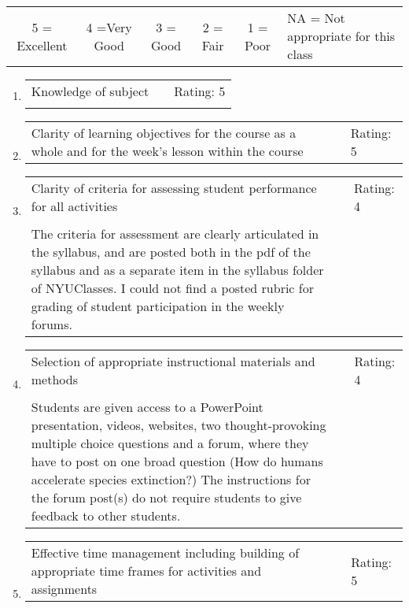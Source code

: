 \documentclass[11pt,dvipsnames]{article}
\begin{document}

{\tabulinesep=1.2mm
	\begin{tabu}{c  c c c c p{4cm} }
		
		5 = Excellent   & 4 =Very Good & 3 = Good & 2 = Fair & 1 = Poor & NA = Not appropriate for this class  \\ 	
	\end{tabu}}
\vskip 0.5cm

\begin{enumerate}[label= {\bf  \arabic*:}]
	\item
	\begin{tabular}[t]{p{} p{3cm} p{2cm} }
		Knowledge of subject & & Rating: 5\\
		& & \\
	\end{tabular} 
	
	
	\item 	\begin{tabular}[t]{p{}  p{3cm} p{3cm} }
		Clarity of learning objectives for the course as a whole and for the week's lesson within the course & & Rating: 5
	\end{tabular} 
	\item 	\begin{tabular}[t]{p{}  p{3cm} p{3cm} }
		Clarity of criteria for assessing student performance for all activities & & Rating: 4\\
		& & \\
		The criteria for assessment are clearly articulated in the syllabus, and are posted both in the pdf of the syllabus and as a separate item in the syllabus folder of NYUClasses. I could not find a posted rubric for grading of student participation in the weekly forums. & & \\
		\end{tabular} 
    \item 	\begin{tabular}[t]{p{}  p{3cm} p{3cm} }
	Selection of appropriate instructional materials and methods & & Rating: 4\\
	& &\\
	Students are given access to a PowerPoint presentation, videos, websites, two thought-provoking multiple choice questions and a forum, where they have to post on one broad question (How do humans accelerate species extinction?) The instructions for the forum post(s) do not require students to give feedback to other students.
\end{tabular} 
\item 	\begin{tabular}[t]{p{}  p{3cm} p{3cm} }
	Effective time management including building of appropriate
	time frames for activities and assignments & & Rating: 5\\
	

\end{tabular}
\end{enumerate}
\end{document}
